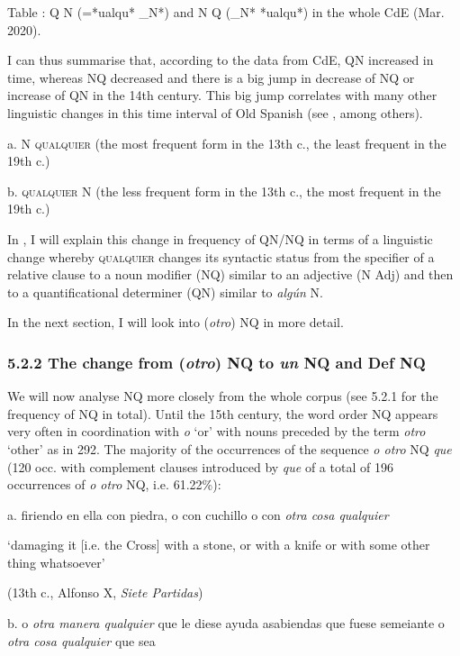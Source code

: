 \documentclass[output=paper]{langscibook}
\begin{document}
Table : Q N (=*ualqu* \_N*) and N Q (\_N* *ualqu*) in the whole CdE (Mar. 2020).

I can thus summarise that, according to the data from CdE, QN increased in time, whereas NQ decreased and there is a big jump in decrease of NQ or increase of QN in the 14th century. This big jump correlates with many other linguistic changes in this time interval of Old Spanish (see \citealt{Eberenz2009}, among others).

  a.  N \textsc{qualquier} (the most frequent form in the 13th c., the least frequent in the 19th c.)

  b.  \textsc{qualquier} N (the less frequent form in the 13th c., the most frequent in the 19th c.)

In , I will explain this change in frequency of QN/NQ in terms of a linguistic change whereby \textsc{qualquier} changes its syntactic status from the specifier of a relative clause to a noun modifier (NQ) similar to an adjective (N Adj) and then to a quantificational determiner (QN) similar to \textit{algún} N.

  In the next section, I will look into (\textit{otro}) NQ in more detail. 

\subsubsection{\textbf{5.2.2} \textbf{The} \textbf{change} \textbf{from} \textbf{(\textit{otro}}\textbf{) }\textbf{NQ} \textbf{to} \textbf{\textit{un} }\textbf{NQ }\textbf{and} \textbf{Def} \textbf{NQ}}

We will now analyse NQ more closely from the whole corpus (see 5.2.1 for the frequency of NQ in total). Until the 15th century, the word order NQ appears very often in coordination with \textit{o} ‘or’ with nouns preceded by the term \textit{otro} ‘other’ as in 292. The majority of the occurrences of the sequence \textit{o otro} NQ \textit{que} (120 occ. with complement clauses introduced by \textit{que} of a total of 196 occurrences of \textit{o otro} NQ, i.e. 61.22\%):

  a.  firiendo en ella con piedra, o con cuchillo o con \textit{otra cosa qualquier} 

    ‘damaging it [i.e. the Cross] with a stone, or with a knife or with some other thing whatsoever’

    (13th c., Alfonso X, \textit{Siete Partidas})

  b.  o \textit{otra manera qualquier} que le diese ayuda asabiendas que fuese semeiante o \textit{otra cosa qualquier} que sea 
\end{document}
